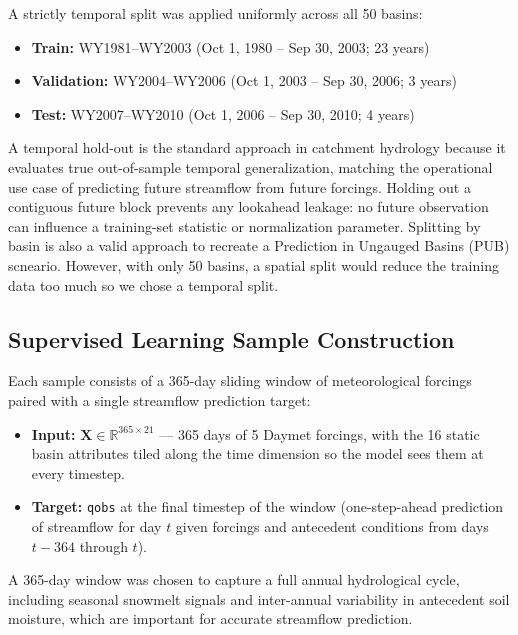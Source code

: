 \documentclass[11pt, letterpaper]{article}
\begin{document}
A strictly temporal split was applied uniformly across all 50 basins:

\begin{itemize}
    \item \textbf{Train:} WY1981--WY2003 (Oct 1, 1980 -- Sep 30, 2003; 23 years)
    \item \textbf{Validation:} WY2004--WY2006 (Oct 1, 2003 -- Sep 30, 2006; 3 years)
    \item \textbf{Test:} WY2007--WY2010 (Oct 1, 2006 -- Sep 30, 2010; 4 years)
\end{itemize}

A temporal hold-out is the standard approach in catchment hydrology because it
evaluates true out-of-sample temporal generalization, matching the operational
use case of predicting future streamflow from future forcings.  Holding out a
contiguous future block prevents any lookahead leakage: no future observation
can influence a training-set statistic or normalization parameter.  Splitting
by basin is also a valid approach to recreate a Prediction in Ungauged Basins
(PUB) scneario. However, with only 50 basins, a spatial split would reduce the 
training data too much so we chose a temporal split.

\subsection{Supervised Learning Sample Construction}

Each sample consists of a 365-day sliding window of meteorological forcings
paired with a single streamflow prediction target:

\begin{itemize}
    \item \textbf{Input:} $\mathbf{X} \in \mathbb{R}^{365 \times 21}$ --- 365
          days of 5 Daymet forcings, with the 16 static basin attributes tiled
          along the time dimension so the model sees them at every timestep.
    \item \textbf{Target:} \texttt{qobs} at the final timestep of the window
          (one-step-ahead prediction of streamflow for day $t$ given forcings
          and antecedent conditions from days $t-364$ through $t$).
\end{itemize}

A 365-day window was chosen to capture a full annual hydrological cycle,
including seasonal snowmelt signals and inter-annual variability in antecedent
soil moisture, which are important for accurate streamflow prediction.
\end{document}
